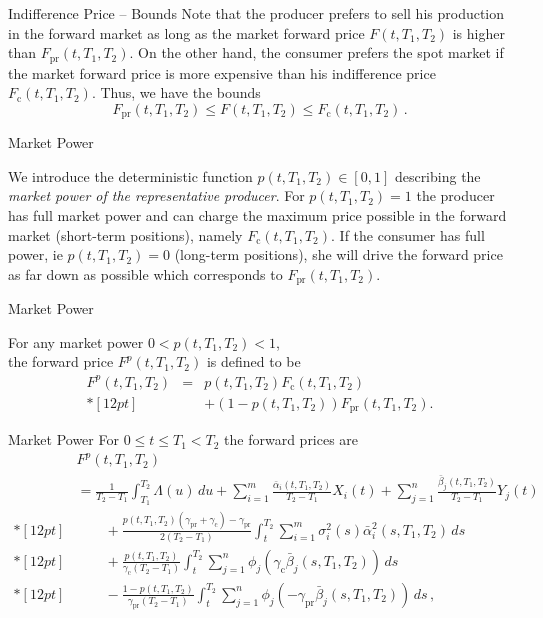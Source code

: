 {Indifference Price -- Bounds}
Note that the producer prefers to sell his production in the forward
market as long as the market forward price $F(t,T_1,T_2)$ is higher
than $F_{\text{pr}}(t,T_1,T_2)$. On the other hand, the consumer
prefers the spot market if the market forward price is more
expensive than his indifference price $F_{\text{c}}(t,T_1,T_2)$.
Thus, we have the bounds
\begin{equation}\label{bounds for forward}
F_{\text{pr}}(t,T_1,T_2)\leq F(t,T_1,T_2)\leq
F_{\text{c}}(t,T_1,T_2)\,.
\end{equation}

{Market Power}

 We introduce the deterministic function $p(t,T_1,T_2)\in[0,1]$
describing the \emph{market power of the representative producer}.
 For $p(t,T_1,T_2)=1$ the
producer has full market power and can charge the maximum price possible in the forward market (short-term positions),
namely $F_{\text{c}}(t,T_1,T_2)$.
 If the
consumer has full power, ie $p(t,T_1,T_2)=0$ (long-term positions), she will drive the
forward price as far down as possible which corresponds to
$F_{\text{pr}}(t,T_1,T_2)$.







{Market Power}

For any market power $0<p(t,T_1,T_2)<1$,\\
the forward price $F^p(t,T_1,T_2)$ is defined to be
\begin{eqnarray}
\nonumber
F^p(t,T_1,T_2)&=&p(t,T_1,T_2)F_{\text{c}}(t,T_1,T_2)\\*[12pt]
&&+(1-p(t,T_1,T_2))
F_{\text{pr}}(t,T_1,T_2).
\end{eqnarray}

{Market Power}
For $0\leq t\leq T_1<T_2$ the forward prices are
$$\begin{array}{ll}
& F^p(t,T_1,T_2)\\
&=\frac1{T_2-T_1}\int_{T_1}^{T_2}\Lambda(u)\,du
+\sum_{i=1}^m\frac{\bar{\alpha}_i(t,T_1,T_2)}{T_2-T_1}X_i(t)+
\sum_{j=1}^n\frac{\bar{\beta}_j(t,T_1,T_2)}{T_2-T_1}Y_j(t) \\*[12pt]
&\qquad+\frac{p(t,T_1,T_2)(\gamma_{\text{pr}}+
\gamma_{\text{c}})-\gamma_{\text{pr}}}{2(T_2-T_1)}\int_t^{T_2}
\sum_{i=1}^m\sigma_i^2(s)\bar{\alpha}_i^2(s,T_1,T_2)\,ds \\*[12pt]
&\qquad+\frac{p(t,T_1,T_2)}{\gamma_{\text{c}}(T_2-T_1)}\int_t^{T_2}
\sum_{j=1}^n\phi_j(\gamma_{\text{c}}\bar{\beta}_j(s,T_1,T_2))\,ds \\*[12pt]
&\qquad-\frac{1-p(t,T_1,T_2)}{\gamma_{\text{pr}}(T_2-T_1)}
\int_t^{T_2}\sum_{j=1}^n\phi_j(-\gamma_{\text{pr}}\bar{\beta}_j(s,T_1,T_2))
\,ds\,,
\end{array}
$$





